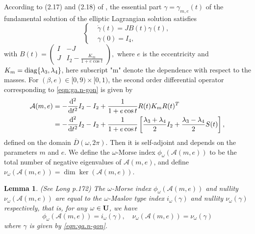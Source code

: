 \documentclass[11pt]{article}
\newtheorem{lemma}{Lemma}[section]
\def\nn{\nonumber}
\def\lb{\label}
\def\d{{\mathrm{d}}}
\def\U{{\bf U}}
\def\om{{\omega}}
\def\cA{{\cal A}}
\def\diag{{\rm diag}}
\def\ol#1{\overline{#1}}
\begin{document}
According to (2.17) and (2.18) of \cite{HLS}, the essential part $\gamma=\gamma_{m, e}(t)$ of the fundamental solution of the elliptic Lagrangian solution satisfies
\begin{equation}\label{eqn:ga.n-gon}
\begin{cases}
&\dot{\gamma}(t)=J B(t) \gamma(t), \\
&\gamma(0)=I_{4},
\end{cases}
\end{equation}
with
$B(t)=\left(\begin{smallmatrix}
I & -J \\
J & I_2 - \frac{K_{m}}{1+e\cos t}
\end{smallmatrix}\right),
$
where $e$ is the eccentricity and $K_{m}=\diag\{\lambda_3, \lambda_4\}$, here subscript "m" denote the dependence with respect to the masses.
 For $(\beta, e) \in[0,9) \times[0,1)$, the second order differential operator corresponding to \eqref{eqn:ga.n-gon} is given by
\begin{align}\lb{eqn:ca.n-gon}
  \cA(m, e) &= -\frac{\d^2}{\d t^2}I_2  -I_2 + \frac{1}{1+e\cos t}R(t)K_mR(t)^T \nn \\
  &= -\frac{\d^2}{\d t^2}I_2  -I_2 + \frac{1}{1+e\cos t}\left[
  \frac{\lambda_3 + \lambda_4}{2}I_2 
  + \frac{\lambda_3 - \lambda_4}{2} S(t)\right], 
\end{align}
defined on the domain $\ol{D}(\om,2\pi)$.
Then it is self-adjoint and depends on the parameters $m$ and $e$. 
We define the $\omega$-Morse index $\phi_{\omega}(\mathcal{A}(m,e))$ to be the total number of negative eigenvalues of $\mathcal{A}(m,e)$,
and define $\nu_{\omega}(\mathcal{A}(m,e))=\dim\ker(\mathcal{A}(m,e))$.

\begin{lemma} (See Long \cite{Lon4} p.172)
    The $\omega$-Morse index $\phi_{\omega}(\mathcal{A}(m,e))$ and nullity
    $\nu_{\omega}(\mathcal{A}(m,e))$ are
    equal to the $\omega$-Maslov type index
    $i_{\omega}(\gamma)$ and nullity
    $\nu_{\omega}(\gamma)$ respectively, that is,
    for any $\omega\in\U$, we have
    \begin{equation}
        \phi_{\omega}(\mathcal{A}(m,e))=i_{\omega}(\gamma),
        \quad
        \nu_{\omega}(\mathcal{A}(m,e))=\nu_{\omega}(\gamma)
    \end{equation}
    where $\gamma$ is given by \eqref{eqn:ga.n-gon}.
\end{lemma}
\end{document}
